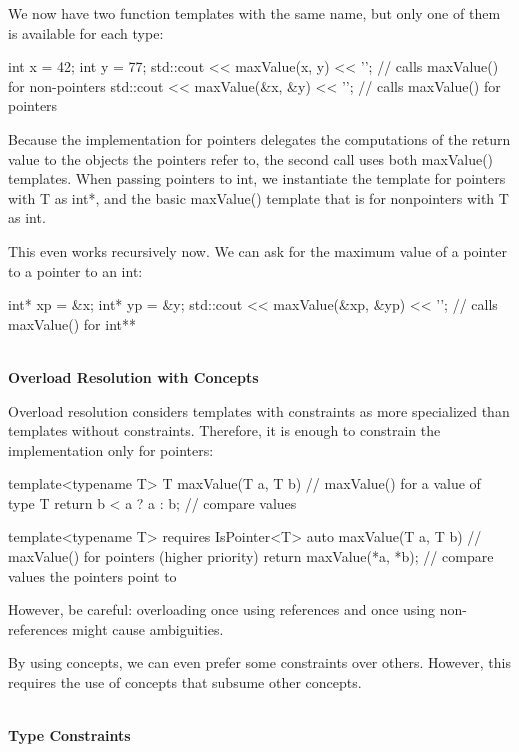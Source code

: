 We now have two function templates with the same name, but only one of them is available for each type:

\begin{cpp}
int x = 42;
int y = 77;
std::cout << maxValue(x, y) << '\n'; // calls maxValue() for non-pointers
std::cout << maxValue(&x, &y) << '\n'; // calls maxValue() for pointers
\end{cpp}

Because the implementation for pointers delegates the computations of the return value to the objects the pointers refer to, the second call uses both maxValue() templates. When passing pointers to int, we instantiate the template for pointers with T as int*, and the basic maxValue() template that is for nonpointers with T as int.

This even works recursively now. We can ask for the maximum value of a pointer to a pointer to an int:

\begin{cpp}
int* xp = &x;
int* yp = &y;
std::cout << maxValue(&xp, &yp) << '\n'; // calls maxValue() for int**
\end{cpp}

\noindent
\hspace*{\fill} \\ %
\textbf{Overload Resolution with Concepts}

Overload resolution considers templates with constraints as more specialized than templates without constraints. Therefore, it is enough to constrain the implementation only for pointers:

\begin{cpp}
template<typename T>
T maxValue(T a, T b) // maxValue() for a value of type T
{
	return b < a ? a : b; // compare values
}

template<typename T>
requires IsPointer<T>
auto maxValue(T a, T b) // maxValue() for pointers (higher priority)
{
	return maxValue(*a, *b); // compare values the pointers point to
}
\end{cpp}

However, be careful: overloading once using references and once using non-references might cause ambiguities.

By using concepts, we can even prefer some constraints over others. However, this requires the use of concepts that subsume other concepts.

\noindent
\hspace*{\fill} \\ %
\textbf{Type Constraints}

